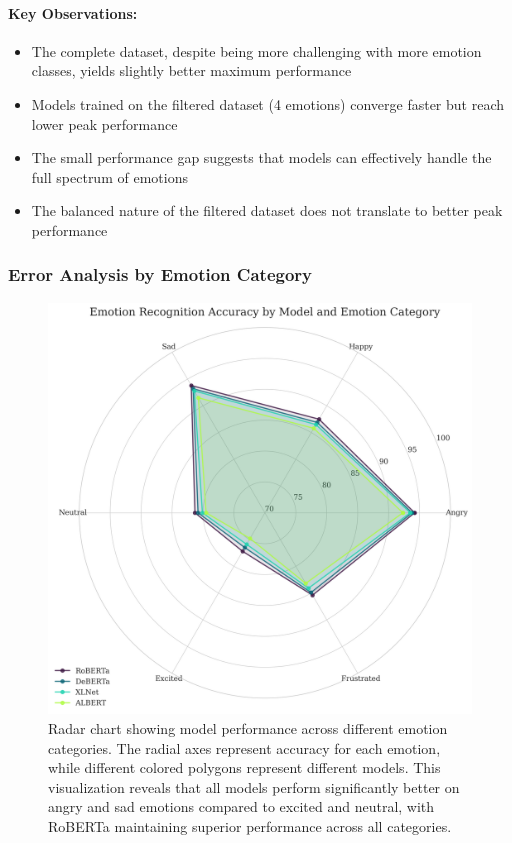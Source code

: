 \documentclass[12pt]{article}
\begin{document}
\paragraph{Key Observations:}
\begin{itemize}
    \item The complete dataset, despite being more challenging with more emotion classes, yields slightly better maximum performance
    \item Models trained on the filtered dataset (4 emotions) converge faster but reach lower peak performance
    \item The small performance gap suggests that models can effectively handle the full spectrum of emotions
    \item The balanced nature of the filtered dataset does not translate to better peak performance
\end{itemize}

\subsubsection{Error Analysis by Emotion Category}
\begin{figure}[h]
    \centering
    \includegraphics[width=0.8\linewidth]{Figures/emotion_performance_radar.png}
    \caption{Radar chart showing model performance across different emotion categories. The radial axes represent accuracy for each emotion, while different colored polygons represent different models. This visualization reveals that all models perform significantly better on angry and sad emotions compared to excited and neutral, with RoBERTa maintaining superior performance across all categories.}
    \label{fig:emotion_radar}
\end{figure}
\end{document}
